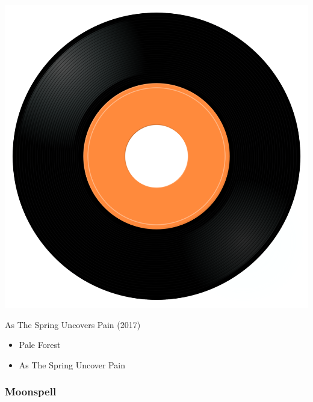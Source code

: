 \begin{minipage}[t]{0.25\textwidth}
\captionsetup{type=figure}
\includegraphics[width=\textwidth]{Images/cover.png}
\caption*{As The Spring Uncovers Pain (2017)}
\end{minipage}
\begin{minipage}[t]{0.25\textwidth}\vspace{0pt}
\begin{itemize}[nosep,leftmargin=1em,labelwidth=*,align=left]
	\setlength{\itemsep}{0pt}
	\item Pale Forest
	\item As The Spring Uncover Pain
\end{itemize}
\end{minipage}

\subsubsection{Moonspell}

